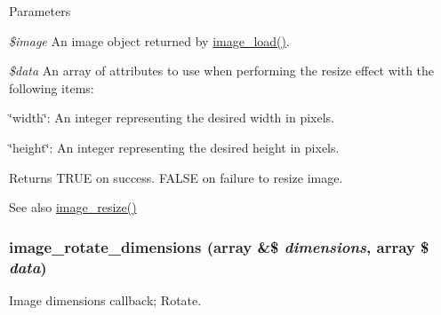 \begin{DoxyParams}{Parameters}
\item[{\em \$image}]An image object returned by \hyperlink{group__image_ga96098e5b039dc3906a656fa889a04776}{image\_\-load()}. \item[{\em \$data}]An array of attributes to use when performing the resize effect with the following items:
\begin{DoxyItemize}
\item \char`\"{}width\char`\"{}: An integer representing the desired width in pixels.
\item \char`\"{}height\char`\"{}: An integer representing the desired height in pixels.
\end{DoxyItemize}\end{DoxyParams}
\begin{DoxyReturn}{Returns}
TRUE on success. FALSE on failure to resize image.
\end{DoxyReturn}
\begin{DoxySeeAlso}{See also}
\hyperlink{group__image_ga991594ed9388b740bc98a162b6bbc449}{image\_\-resize()} 
\end{DoxySeeAlso}
\hypertarget{image_8effects_8inc_ac0eea036cc6c90cf7e96934462dad22f}{
\subsubsection[{image\_\-rotate\_\-dimensions}]{\setlength{\rightskip}{0pt plus 5cm}image\_\-rotate\_\-dimensions (array \&\$ {\em dimensions}, \/  array \$ {\em data})}}
\label{image_8effects_8inc_ac0eea036cc6c90cf7e96934462dad22f}
Image dimensions callback; Rotate.


